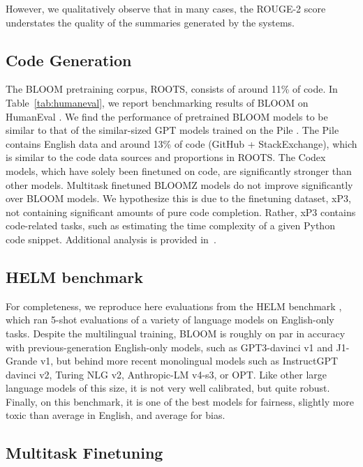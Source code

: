 However, we qualitatively observe that in many cases, the ROUGE-2 score understates the quality of the summaries generated by the systems.

\subsection{Code Generation}
\label{sec:eval:code}

The BLOOM pretraining corpus, ROOTS, consists of around 11\% of code. In Table~\ref{tab:humaneval}, we report benchmarking results of BLOOM on HumanEval \citep{chen2021evaluating}. We find the performance of pretrained BLOOM models to be similar to that of the similar-sized GPT models trained on the Pile \citep{gao2020pile}. The Pile contains English data and around 13\% of code (GitHub + StackExchange), which is similar to the code data sources and proportions in ROOTS. The Codex models, which have solely been finetuned on code, are significantly stronger than other models. Multitask finetuned BLOOMZ models do not improve significantly over BLOOM models. We hypothesize this is due to the finetuning dataset, xP3, not containing significant amounts of pure code completion. Rather, xP3 contains code-related tasks, such as estimating the time complexity of a given Python code snippet. Additional analysis is provided in~\cite{muennighoff2022crosslingual}.

\subsection{HELM benchmark}

For completeness, we reproduce here evaluations from the HELM benchmark \citep{HELM}, which ran 5-shot evaluations of a variety of language models on English-only tasks. Despite the multilingual training, BLOOM is roughly on par in accuracy with previous-generation English-only models, such as GPT3-davinci v1 and J1-Grande v1, but behind more recent monolingual models such as InstructGPT davinci v2, Turing NLG v2, Anthropic-LM v4-s3, or OPT. Like other large language models of this size, it is not very well calibrated, but quite robust. Finally, on this benchmark, it is one of the best models for fairness, slightly more toxic than average in English, and average for bias.

\subsection{Multitask Finetuning}
\label{sec:eval:bloomz}

